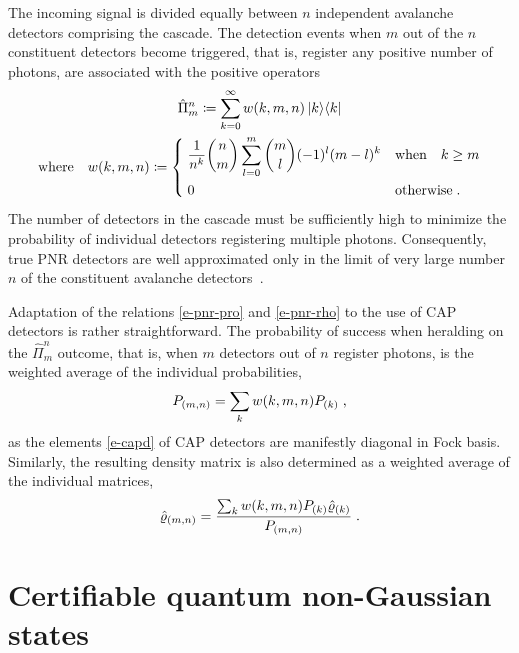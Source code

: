 \documentclass{article}
\begin{document}
The incoming signal is divided equally between $n$ independent avalanche detectors comprising the cascade. The detection events when $m$ out of the $n$ constituent detectors become triggered, that is, register any positive number of photons, are associated with the positive operators~\cite{paul1996}
%
\begin{equation}\label{e-capd}
  \begin{gathered}
  \hat{\Pi}_{m}^{n} 
    \coloneqq \sum_{k = 0}^{\infty} w(k, m, n) \ketbra{k}{k} \\
  \text{where} \quad
  w(k, m, n) 
    \coloneqq 
    \begin{dcases}
      \; \frac{1}{n^{k}} \binom{n}{m} \sum_{l = 0}^{m} \binom{m}{l} (-1)^{l} (m - l)^{k} 
      & \text{when}\quad k \geq m \\
      \; 0 & \text{otherwise} \Qd
    \end{dcases}
  \end{gathered}
\end{equation} 
%
The number of detectors in the cascade must be sufficiently high to minimize the probability of individual detectors registering multiple photons. Consequently, true PNR detectors are well approximated only in the limit of very large number~$n$ of the constituent avalanche detectors~\cite{provaznik2020}.

Adaptation of the relations \eqref{e-pnr-pro} and \eqref{e-pnr-rho} to the use of CAP detectors is rather straightforward. The probability of success when heralding on the $\hat{\Pi}_{m}^{n}$ outcome, that is, when $m$ detectors out of $n$ register photons, is the weighted average of the individual probabilities,
%
\begin{equation}\label{e-cap-pro}
  P_{(m, n)} = \sum_{k} w(k, m, n) P_{(k)} \;\text{,}
\end{equation}
%
as the elements \eqref{e-capd} of CAP detectors are manifestly diagonal in Fock basis. Similarly, the resulting density matrix is also determined as a weighted average of the individual matrices,
\begin{equation}\label{e-cap-rho}
  \hat{\varrho}_{(m, n)} =
    \frac
      { \sum_{k} w(k, m, n) P_{(k)} \hat{\varrho}_{(k)} }
      { P_{(m, n)} }
  \;\text{.}
\end{equation}

%
%

\section{Certifiable quantum non-Gaussian states}
\end{document}
